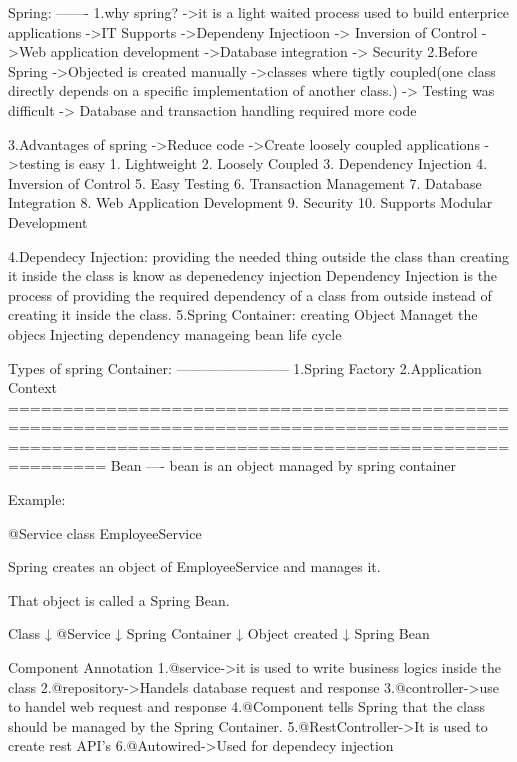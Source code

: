 Spring:
-------
1.why spring?
        ->it is a light waited process used to build enterprice applications
        ->IT Supports 
                ->Dependeny Injectioon
                -> Inversion of Control
                ->Web application development
                ->Database integration
                -> Security
2.Before Spring
        ->Objected is created manually 
        ->classes where tigtly coupled(one class directly depends on a specific implementation of another class.)
        -> Testing was difficult
        -> Database and transaction handling required more code

3.Advantages of spring
        ->Reduce code
        ->Create loosely coupled applications
        ->testing is easy
        1. Lightweight
        2. Loosely Coupled
        3. Dependency Injection
        4. Inversion of Control
        5. Easy Testing
        6. Transaction Management
        7. Database Integration
        8. Web Application Development
        9. Security
        10. Supports Modular Development


4.Dependecy Injection:
         providing the needed thing outside the class than creating it inside the class is know as depenedency injection
         Dependency Injection is the process of providing the required dependency of a class from outside instead of creating it inside the class.
5.Spring Container:
        creating Object
        Managet the objecs
        Injecting dependency
        manageing bean life cycle
        
Types of spring Container:
------------------------
        1.Spring Factory
        2.Application Context
===================================================================================================================================================
Bean
----
        bean is an object managed by spring container
        
        Example:
        
        @Service
        class EmployeeService {
        
        }
        Spring creates an object of EmployeeService and manages it.

        That object is called a Spring Bean.

        Class
          ↓
        @Service
          ↓
        Spring Container
          ↓
        Object created
          ↓
        Spring Bean

Component Annotation
        1.@service->it is used to write business logics inside the class
        2.@repository->Handels database request and response
        3.@controller->use to handel web request and response 
        4.@Component tells Spring that the class should be managed by the Spring Container.
        5.@RestController->It is used to create rest API's 
        6.@Autowired->Used for dependecy injection

